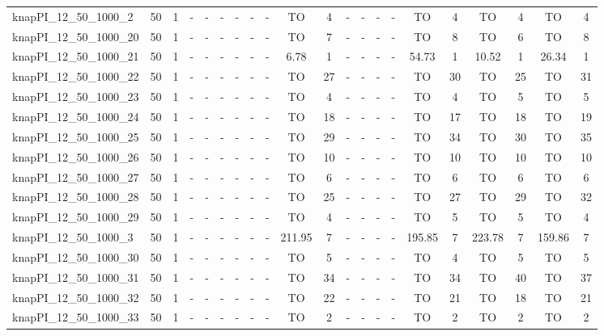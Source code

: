 \begin{sidewaystable}[!ht]
{\begin{tabular}{lcccccccccccccccccccc}
knapPI\_12\_50\_1000\_2 & 50 & 1 &  - &  - &  - &  - &  - &  - & TO & 4 &  - &  - &  - &  - & TO & 4 & TO & 4 & TO & 4 \\
knapPI\_12\_50\_1000\_20 & 50 & 1 &  - &  - &  - &  - &  - &  - & TO & 7 &  - &  - &  - &  - & TO & 8 & TO & 6 & TO & 8 \\
knapPI\_12\_50\_1000\_21 & 50 & 1 &  - &  - &  - &  - &  - &  - & 6.78 & 1 &  - &  - &  - &  - & 54.73 & 1 & 10.52 & 1 & 26.34 & 1 \\
knapPI\_12\_50\_1000\_22 & 50 & 1 &  - &  - &  - &  - &  - &  - & TO & 27 &  - &  - &  - &  - & TO & 30 & TO & 25 & TO & 31 \\
knapPI\_12\_50\_1000\_23 & 50 & 1 &  - &  - &  - &  - &  - &  - & TO & 4 &  - &  - &  - &  - & TO & 4 & TO & 5 & TO & 5 \\
knapPI\_12\_50\_1000\_24 & 50 & 1 &  - &  - &  - &  - &  - &  - & TO & 18 &  - &  - &  - &  - & TO & 17 & TO & 18 & TO & 19 \\
knapPI\_12\_50\_1000\_25 & 50 & 1 &  - &  - &  - &  - &  - &  - & TO & 29 &  - &  - &  - &  - & TO & 34 & TO & 30 & TO & 35 \\
knapPI\_12\_50\_1000\_26 & 50 & 1 &  - &  - &  - &  - &  - &  - & TO & 10 &  - &  - &  - &  - & TO & 10 & TO & 10 & TO & 10 \\
knapPI\_12\_50\_1000\_27 & 50 & 1 &  - &  - &  - &  - &  - &  - & TO & 6 &  - &  - &  - &  - & TO & 6 & TO & 6 & TO & 6 \\
knapPI\_12\_50\_1000\_28 & 50 & 1 &  - &  - &  - &  - &  - &  - & TO & 25 &  - &  - &  - &  - & TO & 27 & TO & 29 & TO & 32 \\
knapPI\_12\_50\_1000\_29 & 50 & 1 &  - &  - &  - &  - &  - &  - & TO & 4 &  - &  - &  - &  - & TO & 5 & TO & 5 & TO & 4 \\
knapPI\_12\_50\_1000\_3 & 50 & 1 &  - &  - &  - &  - &  - &  - & 211.95 & 7 &  - &  - &  - &  - & 195.85 & 7 & 223.78 & 7 & 159.86 & 7 \\
knapPI\_12\_50\_1000\_30 & 50 & 1 &  - &  - &  - &  - &  - &  - & TO & 5 &  - &  - &  - &  - & TO & 4 & TO & 5 & TO & 5 \\
knapPI\_12\_50\_1000\_31 & 50 & 1 &  - &  - &  - &  - &  - &  - & TO & 34 &  - &  - &  - &  - & TO & 34 & TO & 40 & TO & 37 \\
knapPI\_12\_50\_1000\_32 & 50 & 1 &  - &  - &  - &  - &  - &  - & TO & 22 &  - &  - &  - &  - & TO & 21 & TO & 18 & TO & 21 \\
knapPI\_12\_50\_1000\_33 & 50 & 1 &  - &  - &  - &  - &  - &  - & TO & 2 &  - &  - &  - &  - & TO & 2 & TO & 2 & TO & 2 \\

\end{tabular}}
\end{sidewaystable}
